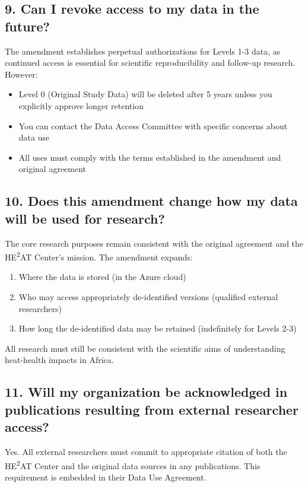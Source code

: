 \documentclass[12pt,letterpaper]{article}
\begin{document}
\subsection*{9. Can I revoke access to my data in the future?}

The amendment establishes perpetual authorizations for Levels 1-3 data, as continued access is essential for scientific reproducibility and follow-up research. However:

\begin{itemize}
\item Level 0 (Original Study Data) will be deleted after 5 years unless you explicitly approve longer retention
\item You can contact the Data Access Committee with specific concerns about data use
\item All uses must comply with the terms established in the amendment and original agreement
\end{itemize}

\subsection*{10. Does this amendment change how my data will be used for research?}

The core research purposes remain consistent with the original agreement and the HE\textsuperscript{2}AT Center's mission. The amendment expands:

\begin{enumerate}
\item Where the data is stored (in the Azure cloud)
\item Who may access appropriately de-identified versions (qualified external researchers)
\item How long the de-identified data may be retained (indefinitely for Levels 2-3)
\end{enumerate}

All research must still be consistent with the scientific aims of understanding heat-health impacts in Africa.

\subsection*{11. Will my organization be acknowledged in publications resulting from external researcher access?}

Yes. All external researchers must commit to appropriate citation of both the HE\textsuperscript{2}AT Center and the original data sources in any publications. This requirement is embedded in their Data Use Agreement.
\end{document}
